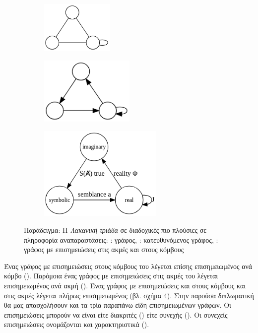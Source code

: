 \begin{figure}[ht]%
\centering
  \begin{subfigure}[α]{0.33\linewidth}
    \centering\includegraphics[width=100pt]{figures/lacan_a}
    \caption{\label{lac:a}}
  \end{subfigure}%
  \begin{subfigure}[β]{0.33\linewidth}
    \centering\includegraphics[width=130pt]{figures/lacan_b}
    \caption{\label{lac:b}}
  \end{subfigure}
  \begin{subfigure}[γ]{0.33\linewidth}
  \centering\includegraphics[width=170pt]{figures/lacan_c}
  \caption{\label{lac:c}}
  \end{subfigure}

  \caption[Παράδειγμα γράφου σε διαδοχικές πιο πλούσιες σε πληροφορία αναπαραστάσεις]{Παράδειγμα: H \textit{Λακανική τριάδα} σε διαδοχικές πιο πλούσιες σε πληροφορία αναπαραστάσεις: : γράφος, : κατευθυνόμενος γράφος, : γράφος με επισημειώσεις στις ακμές και στους κόμβους}
\label{lac}
\end{figure}

Ένας γράφος με επισημειώσεις στους κόμβους του λέγεται επίσης επισημειωμένος ανά κόμβο ().
Παρόμοια ένας γράφος με επισημειώσεις στις ακμές του λέγεται επισημειωμένος ανά ακμή ().
Ένας γράφος με επισημειώσεις και στους κόμβους και στις ακμές λέγεται πλήρως επισημειωμένος (βλ. σχήμα \ref{lac}).
Στην παρούσα διπλωματική θα μας απασχολήσουν και τα τρία παραπάνω είδη επισημειωμένων γράφων. Οι επισημειώσεις μπορούν να είναι είτε διακριτές () είτε συνεχής ().
Οι συνεχείς επισημειώσεις ονομάζονται και χαρακτηριστικά ().

